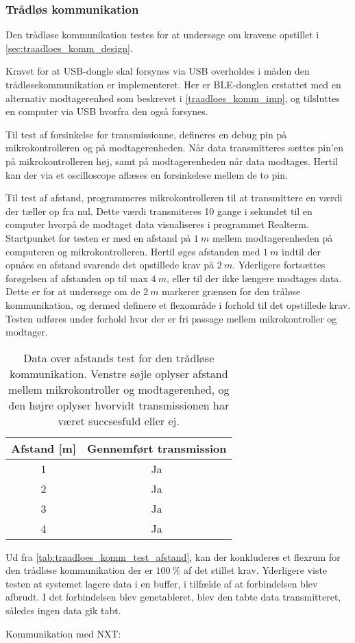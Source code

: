 \subsubsection{Trådløs kommunikation}
Den trådløse kommunikation testes for at undersøge om kravene opstillet i \autoref{sec:traadloes_komm_design}. 

\noindent
Kravet for at USB-dongle skal forsynes via USB overholdes i måden den trådløsekommunikation er implementeret. Her er BLE-donglen erstattet med en alternativ modtagerenhed som beskrevet i \autoref{traadloes_komm_imp}, og tilsluttes en computer via USB hvorfra den også forsynes. 

\noindent
Til test af forsinkelse for transmissionne, defineres en debug pin på mikrokontrolleren og på modtagerenheden. Når data transmitteres sættes pin'en på mikrokontrolleren høj, samt på modtagerenheden når data modtages. Hertil kan der via et oscilloscope aflæses en forsinkelese mellem de to pin. 

\noindent
Til test af afstand, programmeres mikrokontrolleren til at transmittere en værdi der tæller op fra nul. Dette værdi transmiteres 10 gange i sekundet til en computer hvorpå de modtaget data visualiseres i programmet Realterm.
Startpunket for testen er med en afstand på $1~m$ mellem modtagerenheden på computeren og mikrokontrolleren. 
Hertil øges afstanden med $1~m$ indtil der opnåes en afstand svarende det opstillede krav på $2~m$. Yderligere fortsættes forøgelsen af afstanden op til max $4~m$, eller til der ikke længere modtages data. Dette er for at undersøge om de $2~m$ markerer grænsen for den tråløse kommunikation, og dermed definere et flexområde i forhold til det opstillede krav. Testen udføres under forhold hvor der er fri passage mellem mikrokontroller og modtager.  

\begin{table}[H]
\centering
\begin{tabular}{|c|c|}
\hline 
Afstand [m] & Gennemført transmission \\ 
\hline 
1 & Ja \\ 
\hline 
2 & Ja \\ 
\hline 
3 & Ja \\ 
\hline 
4 & Ja \\ 
\hline 
\end{tabular} 
\caption{Data over afstands test for den trådløse kommunikation. Venstre søjle oplyser afstand mellem mikrokontroller og modtagerenhed, og den højre oplyser hvorvidt transmissionen har været succsesfuld eller ej.}
\label{tab:traadloes_komm_test_afstand}
\end{table}

Ud fra \autoref{tab:traadloes_komm_test_afstand}, kan der konkluderes et flexrum for den trådløse kommunikation der er $100~\%$ af det stillet krav. Yderligere viste testen at systemet lagere data i en buffer, i tilfælde af at forbindelsen blev afbrudt. I det forbindelsen blev genetableret, blev den tabte data transmitteret, således ingen data gik tabt. 

Kommunikation med NXT:
 